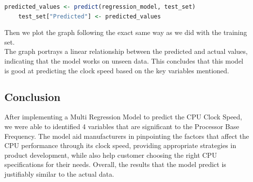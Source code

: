 \begin{lstlisting}[language=R]
    predicted_values <- predict(regression_model, test_set)
    test_set["Predicted"] <- predicted_values
\end{lstlisting}

Then we plot the graph following the exact same way as we did with the training set.\\


The graph portrays a linear relationship between the predicted and actual values, indicating that the model works on unseen data. This concludes that this model is good at predicting the clock speed based on the key variables mentioned.

\subsection{Conclusion}
After implementing a Multi Regression Model to predict the CPU Clock Speed, we were able to identified 4 variables that are significant to the Processor Base Frequency. The model aid manufacturers in pinpointing the factors that affect the CPU performance through its clock speed, providing appropriate strategies in product development, while also help customer choosing the right CPU specifications for their needs. Overall, the results that the model predict is justifiably similar to the actual data. 
\newpage
